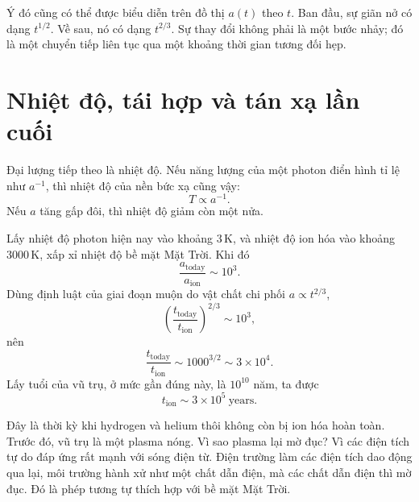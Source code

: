 Ý đó cũng có thể được biểu diễn trên đồ thị \(a(t)\) theo \(t\). Ban đầu, sự giãn nở có dạng \(t^{1/2}\). Về sau, nó có dạng \(t^{2/3}\). Sự thay đổi không phải là một bước nhảy; đó là một chuyển tiếp liên tục qua một khoảng thời gian tương đối hẹp.

\begin{classroomqa}
\end{classroomqa}

\section{Nhiệt độ, tái hợp và tán xạ lần cuối}

Đại lượng tiếp theo là nhiệt độ. Nếu năng lượng của một photon điển hình tỉ lệ như \(a^{-1}\), thì nhiệt độ của nền bức xạ cũng vậy:
\begin{equation}
T\propto a^{-1}.
\end{equation}
Nếu \(a\) tăng gấp đôi, thì nhiệt độ giảm còn một nửa.

Lấy nhiệt độ photon hiện nay vào khoảng \(3\,\mathrm K\), và nhiệt độ ion hóa vào khoảng \(3000\,\mathrm K\), xấp xỉ nhiệt độ bề mặt Mặt Trời. Khi đó
\begin{equation}
\frac{a_{\mathrm{today}}}{a_{\mathrm{ion}}}\sim 10^3.
\end{equation}
Dùng định luật của giai đoạn muộn do vật chất chi phối \(a\propto t^{2/3}\),
\begin{equation}
\left(\frac{t_{\mathrm{today}}}{t_{\mathrm{ion}}}\right)^{2/3}\sim 10^3,
\end{equation}
nên
\begin{equation}
\frac{t_{\mathrm{today}}}{t_{\mathrm{ion}}}\sim 1000^{3/2}\sim 3\times 10^4.
\end{equation}
Lấy tuổi của vũ trụ, ở mức gần đúng này, là \(10^{10}\) năm, ta được
\begin{equation}
t_{\mathrm{ion}}\sim 3\times 10^5\ \mathrm{years}.
\end{equation}

Đây là thời kỳ khi hydrogen và helium thôi không còn bị ion hóa hoàn toàn. Trước đó, vũ trụ là một plasma nóng. Vì sao plasma lại mờ đục? Vì các điện tích tự do đáp ứng rất mạnh với sóng điện từ. Điện trường làm các điện tích dao động qua lại, môi trường hành xử như một chất dẫn điện, mà các chất dẫn điện thì mờ đục. Đó là phép tương tự thích hợp với bề mặt Mặt Trời.


